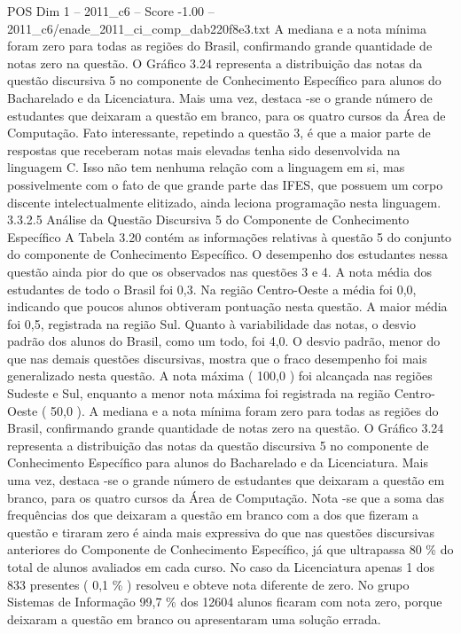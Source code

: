 \begin{textsample}{POS Dim 1 – 2011\_c6 – Score -1.00 – 2011\_c6/enade\_2011\_ci\_comp\_dab220f8e3.txt}
A mediana e a nota mínima foram zero para todas as regiões do Brasil, confirmando grande quantidade de notas zero na questão.
O Gráfico 3.24 representa a distribuição das notas da questão discursiva 5 no componente de Conhecimento Específico para alunos do Bacharelado e da Licenciatura.
Mais uma vez, destaca -se o grande número de estudantes que deixaram a questão em branco, para os quatro cursos da Área de Computação.
Fato interessante, repetindo a questão 3, é que a maior parte de respostas que receberam notas mais elevadas tenha sido desenvolvida na linguagem C.
Isso não tem nenhuma relação com a linguagem em si, mas possivelmente com o fato de que grande parte das IFES, que possuem um corpo discente intelectualmente elitizado, ainda leciona programação nesta linguagem. 3.3.2.5 Análise da Questão Discursiva 5 do Componente de Conhecimento Específico A Tabela 3.20 contém as informações relativas à questão 5 do conjunto do componente de Conhecimento Específico.
O desempenho dos estudantes nessa questão ainda pior do que os observados nas questões 3 e 4.
A nota média dos estudantes de todo o Brasil foi 0,3.
Na região Centro-Oeste a média foi 0,0, indicando que poucos alunos obtiveram pontuação nesta questão.
A maior média foi 0,5, registrada na região Sul.
Quanto à variabilidade das notas, o desvio padrão dos alunos do Brasil, como um todo, foi 4,0.
O desvio padrão, menor do que nas demais questões discursivas, mostra que o fraco desempenho foi mais generalizado nesta questão.
A nota máxima ( 100,0 ) foi alcançada nas regiões Sudeste e Sul, enquanto a menor nota máxima foi registrada na região Centro-Oeste ( 50,0 ).
A mediana e a nota mínima foram zero para todas as regiões do Brasil, confirmando grande quantidade de notas zero na questão.
O Gráfico 3.24 representa a distribuição das notas da questão discursiva 5 no componente de Conhecimento Específico para alunos do Bacharelado e da Licenciatura.
Mais uma vez, destaca -se o grande número de estudantes que deixaram a questão em branco, para os quatro cursos da Área de Computação.
Nota -se que a soma das frequências dos que deixaram a questão em branco com a dos que fizeram a questão e tiraram zero é ainda mais expressiva do que nas questões discursivas anteriores do Componente de Conhecimento Específico, já que ultrapassa 80 \% do total de alunos avaliados em cada curso.
No caso da Licenciatura apenas 1 dos 833 presentes ( 0,1 \% ) resolveu e obteve nota diferente de zero.
No grupo Sistemas de Informação 99,7 \% dos 12604 alunos ficaram com nota zero, porque deixaram a questão em branco ou apresentaram uma solução errada.

\end{textsample}
